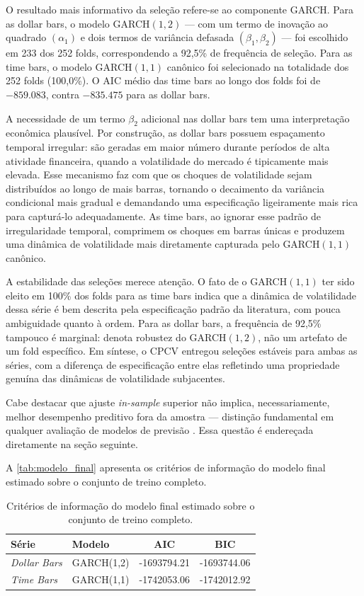O resultado mais informativo da seleção refere-se ao componente GARCH. Para as dollar bars,
o modelo GARCH$(1,2)$ --- com um termo de inovação ao quadrado $(\alpha_1)$ e dois termos
de variância defasada $(\beta_1, \beta_2)$ --- foi escolhido em 233 dos 252 folds,
correspondendo a 92,5\% de frequência de seleção. Para as time bars, o modelo GARCH$(1,1)$
canônico foi selecionado na totalidade dos 252 folds (100,0\%). O AIC médio das time bars
ao longo dos folds foi de $-859.083$, contra $-835.475$ para as dollar bars.

A necessidade de um termo $\beta_2$ adicional nas dollar bars tem uma interpretação
econômica plausível. Por construção, as dollar bars possuem espaçamento temporal irregular:
são geradas em maior número durante períodos de alta atividade financeira, quando a
volatilidade do mercado é tipicamente mais elevada. Esse mecanismo faz com que os choques
de volatilidade sejam distribuídos ao longo de mais barras, tornando o decaimento da
variância condicional mais gradual e demandando uma especificação ligeiramente mais rica
para capturá-lo adequadamente. As time bars, ao ignorar esse padrão de irregularidade
temporal, comprimem os choques em barras únicas e produzem uma dinâmica de volatilidade
mais diretamente capturada pelo GARCH$(1,1)$ canônico.

A estabilidade das seleções merece atenção. O fato de o GARCH$(1,1)$ ter sido eleito
em 100\% dos folds para as time bars indica que a dinâmica de volatilidade dessa série
é bem descrita pela especificação padrão da literatura, com pouca ambiguidade quanto à
ordem. Para as dollar bars, a frequência de 92,5\% tampouco é marginal: denota robustez
do GARCH$(1,2)$, não um artefato de um fold específico. Em síntese, o CPCV entregou
seleções estáveis para ambas as séries, com a diferença de especificação entre elas
refletindo uma propriedade genuína das dinâmicas de volatilidade subjacentes.

Cabe destacar que ajuste \textit{in-sample} superior não implica, necessariamente,
melhor desempenho preditivo fora da amostra — distinção fundamental em qualquer
avaliação de modelos de previsão \cite{diebold2015}. Essa questão é endereçada
diretamente na seção seguinte.

A \autoref{tab:modelo_final} apresenta os critérios de informação do
modelo final estimado sobre o conjunto de treino completo.

\begin{table}[H]
\centering
\caption{Critérios de informação do modelo final estimado sobre o
conjunto de treino completo.}
\label{tab:modelo_final}
\begin{tabular}{llSS}
\toprule
{Série} & {Modelo} & {AIC} & {BIC} \\
\midrule
\emph{Dollar Bars} & GARCH(1,2) & -1693794.21 & -1693744.06 \\
\emph{Time Bars}   & GARCH(1,1) & -1742053.06 & -1742012.92 \\
\bottomrule
\end{tabular}
\end{table}

